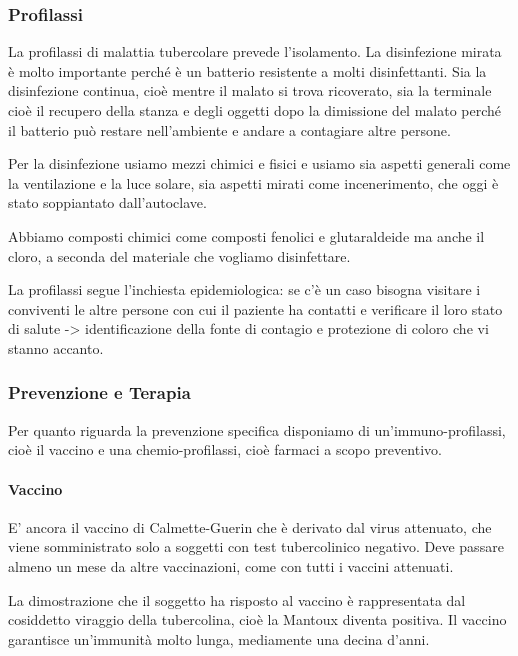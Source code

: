 \subsubsection{Profilassi}


La profilassi di malattia tubercolare prevede l'isolamento. La
disinfezione mirata è molto importante perché è un batterio resistente a
molti disinfettanti. Sia la disinfezione continua, cioè mentre il malato
si trova ricoverato, sia la terminale cioè il recupero della stanza e
degli oggetti dopo la dimissione del malato perché il batterio può
restare nell'ambiente e andare a contagiare altre persone.

Per la disinfezione usiamo mezzi chimici e fisici e usiamo sia aspetti
generali come la ventilazione e la luce solare, sia aspetti mirati come
incenerimento, che oggi è stato soppiantato dall'autoclave.

Abbiamo composti chimici come composti fenolici e glutaraldeide ma anche
il cloro, a seconda del materiale che vogliamo disinfettare.

La profilassi segue l'inchiesta epidemiologica: se c'è un caso bisogna
visitare i conviventi le altre persone con cui il paziente ha contatti e
verificare il loro stato di salute -> identificazione della fonte di
contagio e protezione di coloro che vi stanno accanto.

\subsubsection{Prevenzione e Terapia}


Per quanto riguarda la prevenzione specifica disponiamo di
un'immuno-profilassi, cioè il vaccino e una chemio-profilassi, cioè
farmaci a scopo preventivo.

\paragraph{Vaccino}


E' ancora il vaccino di Calmette-Guerin che è derivato dal virus
attenuato, che viene somministrato solo a soggetti con test
tubercolinico negativo. Deve passare almeno un mese da altre
vaccinazioni, come con tutti i vaccini attenuati.

La dimostrazione che il soggetto ha risposto al vaccino è rappresentata
dal cosiddetto viraggio della tubercolina, cioè la Mantoux diventa
positiva. Il vaccino garantisce un'immunità molto lunga, mediamente una
decina d'anni.

